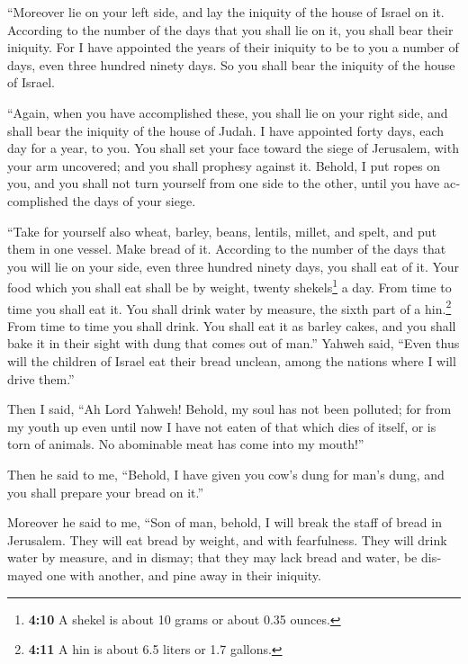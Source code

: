 \begin{paracol}{2}
\begin{otherlanguage}{english}
 ``Moreover lie on your left side, and lay the iniquity of
the house of Israel on it. According to the number of the days that you
shall lie on it, you shall bear their iniquity.  For I
have appointed the years of their iniquity to be to you a number of
days, even three hundred ninety days. So you shall bear the iniquity of
the house of Israel.

 ``Again, when you have accomplished these, you shall lie
on your right side, and shall bear the iniquity of the house of Judah. I
have appointed forty days, each day for a year, to you. 
You shall set your face toward the siege of Jerusalem, with your arm
uncovered; and you shall prophesy against it.  Behold, I
put ropes on you, and you shall not turn yourself from one side to the
other, until you have accomplished the days of your siege.

 ``Take for yourself also wheat, barley, beans, lentils,
millet, and spelt, and put them in one vessel. Make bread of it.
According to the number of the days that you will lie on your side, even
three hundred ninety days, you shall eat of it.  Your
food which you shall eat shall be by weight, twenty shekels\footnote{\textbf{4:10}
  A shekel is about 10 grams or about 0.35 ounces.} a day. From time to
time you shall eat it.  You shall drink water by measure,
the sixth part of a hin.\footnote{\textbf{4:11} A hin is about 6.5
  liters or 1.7 gallons.} From time to time you shall drink.
 You shall eat it as barley cakes, and you shall bake it
in their sight with dung that comes out of man.''  Yahweh
said, ``Even thus will the children of Israel eat their bread unclean,
among the nations where I will drive them.''

 Then I said, ``Ah Lord Yahweh! Behold, my soul has not
been polluted; for from my youth up even until now I have not eaten of
that which dies of itself, or is torn of animals. No abominable meat has
come into my mouth!''

 Then he said to me, ``Behold, I have given you cow's
dung for man's dung, and you shall prepare your bread on it.''

 Moreover he said to me, ``Son of man, behold, I will
break the staff of bread in Jerusalem. They will eat bread by weight,
and with fearfulness. They will drink water by measure, and in dismay;
 that they may lack bread and water, be dismayed one with
another, and pine away in their iniquity.


\end{otherlanguage}
\end{paracol}
